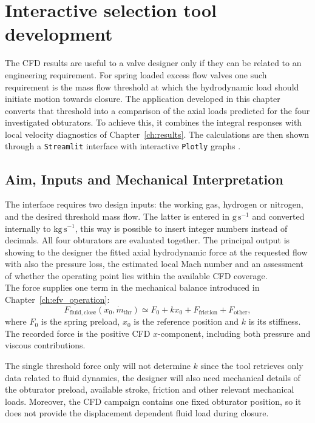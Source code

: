 \chapter{Interactive selection tool development}
\label{ch:selection_tool}

The CFD results are useful to a valve designer only if they can be related to an engineering requirement. For spring loaded excess flow valves one such requirement is the mass flow threshold at which the hydrodynamic load should initiate motion towards closure. The application developed in this chapter converts that threshold into a comparison of the axial loads predicted for the four investigated obturators. To achieve this, it combines the integral responses with local velocity diagnostics of Chapter~\ref{ch:results}. The calculations are then shown through a \texttt{Streamlit} interface with interactive \texttt{Plotly} graphs \cite{streamlit_docs,plotly_docs}.

\section{Aim, Inputs and Mechanical Interpretation}
\label{sec:recommendation_logic}

The interface requires two design inputs: the working gas, hydrogen or nitrogen, and the desired threshold mass flow. The latter is entered in $\mathrm{g\,s^{-1}}$ and converted internally to $\mathrm{kg\,s^{-1}}$, this way is possible to insert integer numbers instead of decimals. All four obturators are evaluated together. The principal output is showing to the designer the fitted axial hydrodynamic force at the requested flow with also the pressure loss, the estimated local Mach number and an assessment of whether the operating point lies within the available CFD coverage.\\

The force supplies one term in the mechanical balance introduced in Chapter~\ref{ch:efv_operation}:
\begin{equation}
F_{\mathrm{fluid,close}}(x_0,\dot m_{\mathrm{thr}})
\simeq F_0+kx_0+F_{\mathrm{friction}}+F_{\mathrm{other}},
\label{eq:tool_spring_balance}
\end{equation}
where $F_0$ is the spring preload, $x_0$ is the reference position and $k$ is its stiffness. The recorded force is the positive CFD $x$-component, including both pressure and viscous contributions.

The single threshold force only will not determine $k$ since the tool retrieves only data related to fluid dynamics, the designer will also need mechanical details of the obturator preload, available stroke, friction and other relevant mechanical loads. Moreover, the CFD campaign contains one fixed obturator position, so it does not provide the displacement dependent fluid load during closure.


